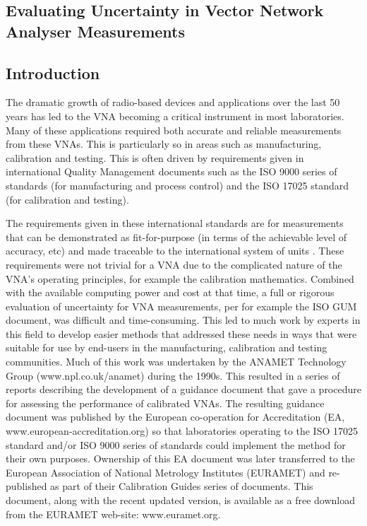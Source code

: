 \documentclass[../thesis/thesis.tex]{subfiles}
\begin{document}
	
\onlyinsubfile{\setcounter{chapter}{3}}

\begin{refsection}
\chapter[Evaluating Uncertainty in VNA Measurements]{Evaluating Uncertainty in Vector Network Analyser Measurements}

\section{Introduction}

The dramatic growth of radio-based devices and applications over the last 50 years has led to the VNA becoming a critical instrument in most laboratories. Many of these applications required both accurate and reliable measurements from these VNAs.  This is particularly so in areas such as manufacturing, calibration and testing.  This is often driven by requirements given in international Quality Management documents such as the ISO 9000 series of standards \cite{ISO9000} (for manufacturing and process control) and the ISO 17025 standard \cite{ISO17025} (for calibration and testing).

The requirements given in these international standards are for measurements that can be demonstrated as fit-for-purpose (in terms of the achievable level of accuracy, etc) and made traceable to the international system of units \cite{SI_2019, SI_2019B}.  These requirements were not trivial for a VNA due to the complicated nature of the VNA’s operating principles, for example the calibration mathematics. Combined with the available computing power and cost at that time, a full or rigorous evaluation of uncertainty for VNA measurements, per for example the ISO GUM document, was difficult and time-consuming. This led to much work by experts in this field to develop easier methods that addressed these needs in ways that were suitable for use by end-users in the manufacturing, calibration and testing communities.  Much of this work was undertaken by the ANAMET Technology Group (www.npl.co.uk/anamet) during the 1990s.  This resulted in a series of reports \cite{ANAMET_1996, ANAMET_1998, ANAMET_1999} describing the development of a guidance document that gave a procedure for assessing the performance of calibrated VNAs.  The resulting guidance document \cite{EA_2000} was published by the European co-operation for Accreditation (EA, www.european-accreditation.org) so that laboratories operating to the ISO 17025 standard and/or ISO 9000 series of standards could implement the method for their own purposes.  Ownership of this EA document was later transferred to the European Association of National Metrology Institutes (EURAMET) and re-published \cite{EURAMET_2011} as part of their Calibration Guides series of documents. This document, along with the recent updated version, is available as a free download from the EURAMET web-site: www.euramet.org.


\end{refsection}
\end{document}
